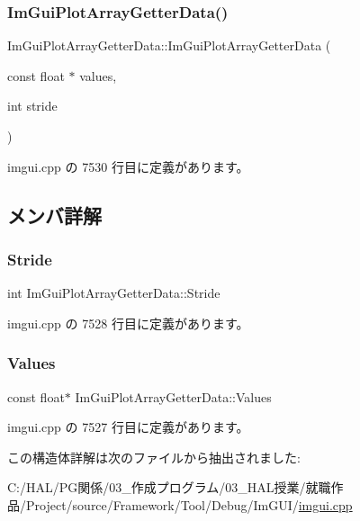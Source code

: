 \subsubsection{\texorpdfstring{Im\+Gui\+Plot\+Array\+Getter\+Data()}{ImGuiPlotArrayGetterData()}}
{\footnotesize\ttfamily Im\+Gui\+Plot\+Array\+Getter\+Data\+::\+Im\+Gui\+Plot\+Array\+Getter\+Data (\begin{DoxyParamCaption}\item[{const float $\ast$}]{values,  }\item[{int}]{stride }\end{DoxyParamCaption})\hspace{0.3cm}{\ttfamily [inline]}}



 imgui.\+cpp の 7530 行目に定義があります。



\subsection{メンバ詳解}
\mbox{\label{struct_im_gui_plot_array_getter_data_aecb2cce4ea91d95ec81937de656cfcd6}} 
\subsubsection{\texorpdfstring{Stride}{Stride}}
{\footnotesize\ttfamily int Im\+Gui\+Plot\+Array\+Getter\+Data\+::\+Stride}



 imgui.\+cpp の 7528 行目に定義があります。

\mbox{\label{struct_im_gui_plot_array_getter_data_aa40ff2e945549744fc622891089ae0fd}} 
\subsubsection{\texorpdfstring{Values}{Values}}
{\footnotesize\ttfamily const float$\ast$ Im\+Gui\+Plot\+Array\+Getter\+Data\+::\+Values}



 imgui.\+cpp の 7527 行目に定義があります。



この構造体詳解は次のファイルから抽出されました\+:\begin{DoxyCompactItemize}
\item 
C\+:/\+H\+A\+L/\+P\+G関係/03\+\_\+作成プログラム/03\+\_\+\+H\+A\+L授業/就職作品/\+Project/source/\+Framework/\+Tool/\+Debug/\+Im\+G\+U\+I/\mbox{\hyperlink{imgui_8cpp}{imgui.\+cpp}}\end{DoxyCompactItemize}
